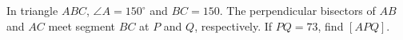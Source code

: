 In triangle $ABC$, $\angle A=150^\circ$ and $BC=150$. The perpendicular bisectors of $AB$ and $AC$ meet segment $BC$ at $P$ and $Q$, respectively. If $PQ=73$, find $[APQ]$.
